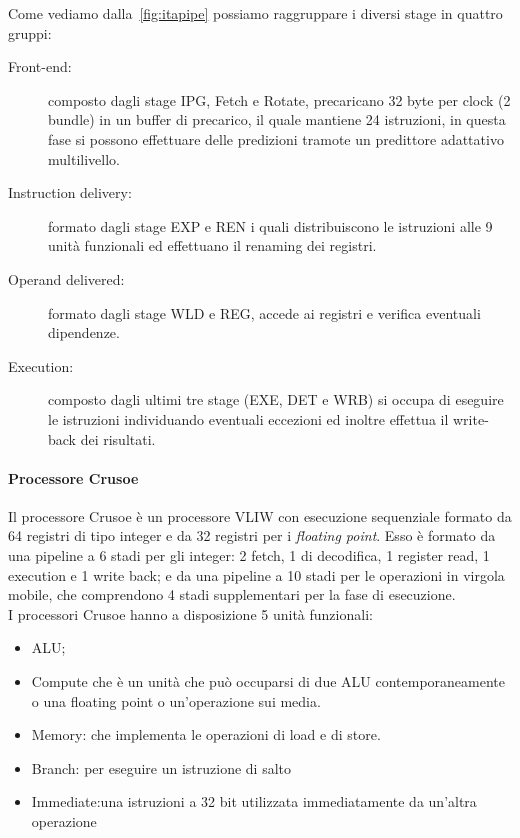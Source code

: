 Come vediamo dalla \figurename\,\ref{fig:itapipe} possiamo raggruppare i diversi stage in quattro gruppi:
\begin{description}
\item[Front-end:] composto dagli stage IPG, Fetch e Rotate, precaricano 32 byte per clock (2 bundle) in un buffer di precarico, il quale mantiene 24 istruzioni, in questa fase si possono effettuare delle predizioni tramote un predittore adattativo multilivello.
\item[Instruction delivery:] formato dagli stage EXP e REN i quali distribuiscono le istruzioni alle 9 unità funzionali ed effettuano il renaming dei registri.
\item[Operand delivered:] formato dagli stage WLD e REG, accede ai registri e verifica eventuali dipendenze.
\item[Execution:] composto dagli ultimi tre stage (EXE, DET e WRB) si occupa di eseguire le istruzioni individuando eventuali eccezioni ed inoltre effettua il write-back dei risultati.
\end{description}
\paragraph{Processore Crusoe}
Il processore Crusoe è un processore VLIW con esecuzione sequenziale formato da 64 registri di tipo integer e da 32 registri per i \emph{floating point}. Esso è formato da una pipeline a 6 stadi per gli integer: 2 fetch, 1 di decodifica, 1 register read, 1 execution e 1 write back; e da una pipeline a 10 stadi per le operazioni in virgola mobile, che comprendono 4 stadi supplementari per la fase di esecuzione.\\
I processori Crusoe hanno a disposizione 5 unità funzionali:
\begin{itemize}
\item ALU;
\item Compute che è un unità che può occuparsi di due ALU contemporaneamente o una floating point o un'operazione sui media.
\item Memory: che implementa le operazioni di load e di store.
\item Branch: per eseguire un istruzione di salto
\item Immediate:una istruzioni a 32 bit utilizzata immediatamente da un'altra operazione
\end{itemize}
